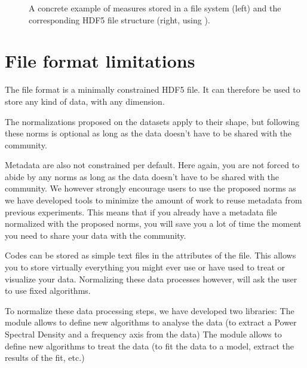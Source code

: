 \documentclass[letterpaper,10pt,english]{sphinxmanual}
\begin{document}
\begin{figure}[htbp]
\centering
\capstart

\noindent{}
\caption{A concrete example of measures stored in a file system (left) and the corresponding HDF5 file structure (right, using ).}\label{\detokenize{source/project_nutshell:id1}}\label{\detokenize{source/project_nutshell:file-system-hdf5-file}}\end{figure}


\section{File format limitations}
\label{\detokenize{source/project_nutshell:file-format-limitations}}
\sphinxAtStartPar
The file format is a minimally constrained HDF5 file. It can therefore be used to store any kind of data, with any dimension.

\sphinxAtStartPar
The normalizations proposed on the datasets apply to their shape, but following these norms is optional as long as the data doesn’t have to be shared with the community.

\sphinxAtStartPar
Metadata are also not constrained per default. Here again, you are not forced to abide by any norms as long as the data doesn’t have to be shared with the community. We however strongly encourage users to use the proposed norms as we have developed tools to minimize the amount of work to re\sphinxhyphen{}use metadata from previous experiments. This means that if you already have a metadata file normalized with the proposed norms, you will save you a lot of time the moment you need to share your data with the community.

\sphinxAtStartPar
{}

\sphinxAtStartPar
Codes can be stored as simple text files in the attributes of the file. This allows you to store virtually everything you might ever use or have used to treat or visualize your data. Normalizing these data processes however, will ask the user to use fixed algorithms.

\sphinxAtStartPar
To normalize these data processing steps, we have developed two libraries:
\sphinxhyphen{} The  module allows to define new algorithms to analyse the data (to extract a Power Spectral Density and a frequency axis from the data)
\sphinxhyphen{} The  module allows to define new algorithms to treat the data (to fit the data to a model, extract the results of the fit, etc.)
\end{document}
